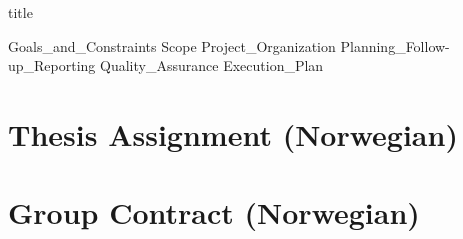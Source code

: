 \documentclass{article}
\begin{document}
{title}

\frontmatter

\begingroup
\hypersetup{hidelinks}

\tableofcontents

\listoffigures
\listoftables
\endgroup

\mainmatter

{Goals_and_Constraints}
{Scope}
{Project_Organization}
{Planning_Follow-up_Reporting}
{Quality_Assurance}
{Execution_Plan}

\newpage
\printbibliography[heading = bibintoc, title = Bibliography]

\addappendix

\section{Thesis Assignment (Norwegian)}
\label{appendix:thesis_assignment}

\begin{minipage}{\textwidth}
    \centering
    
\end{minipage}



\section{Group Contract (Norwegian)}
\label{appendix:group_contract}

\begin{minipage}{\textwidth}
    \centering
    
\end{minipage}

\end{document}
